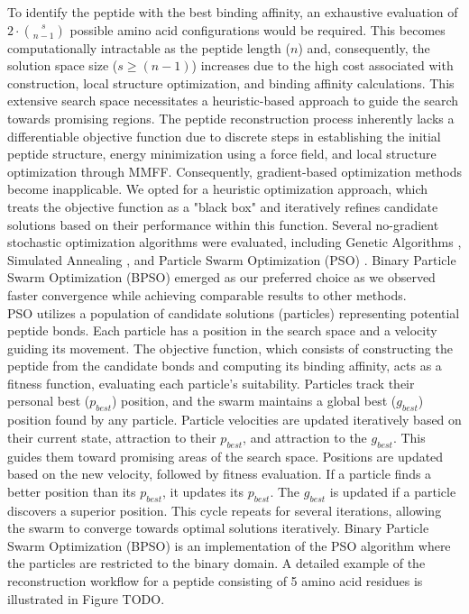 To identify the peptide with the best binding affinity, an exhaustive evaluation of $2 \cdot {s \choose n-1}$ possible amino acid configurations would be required. This becomes computationally intractable as the peptide length ($n$) and, consequently, the solution space size ($s \geq (n-1)$) increases due to the high cost associated with construction, local structure optimization, and binding affinity calculations. This extensive search space necessitates a heuristic-based approach to guide the search towards promising regions. The peptide reconstruction process inherently lacks a differentiable objective function due to discrete steps in establishing the initial peptide structure, energy minimization using a force field, and local structure optimization through MMFF. Consequently, gradient-based optimization methods become inapplicable. We opted for a heuristic optimization approach, which treats the objective function as a "black box" and iteratively refines candidate solutions based on their performance within this function. Several no-gradient stochastic optimization algorithms were evaluated, including Genetic Algorithms \cite{holland1992adaptation}, Simulated Annealing \cite{kirkpatrick1983optimization}, and Particle Swarm Optimization (PSO) \cite{eberhart1995new, kennedy1995particle}. Binary Particle Swarm Optimization (BPSO) emerged as our preferred choice as we observed faster convergence while achieving comparable results to other methods. \\

PSO utilizes a population of candidate solutions (particles) representing potential peptide bonds. Each particle has a position in the search space and a velocity guiding its movement. The objective function, which consists of constructing the peptide from the candidate bonds and computing its binding affinity, acts as a fitness function, evaluating each particle's suitability. Particles track their personal best ($p_{best}$) position, and the swarm maintains a global best ($g_{best}$) position found by any particle. Particle velocities are updated iteratively based on their current state, attraction to their $p_{best}$, and attraction to the $g_{best}$. This guides them toward promising areas of the search space. Positions are updated based on the new velocity, followed by fitness evaluation. If a particle finds a better position than its $p_{best}$, it updates its $p_{best}$. The $g_{best}$ is updated if a particle discovers a superior position. This cycle repeats for several iterations, allowing the swarm to converge towards optimal solutions iteratively. Binary Particle Swarm Optimization (BPSO) is an implementation of the PSO algorithm where the particles are restricted to the binary domain. A detailed example of the reconstruction workflow for a peptide consisting of 5 amino acid residues is illustrated in Figure TODO.

